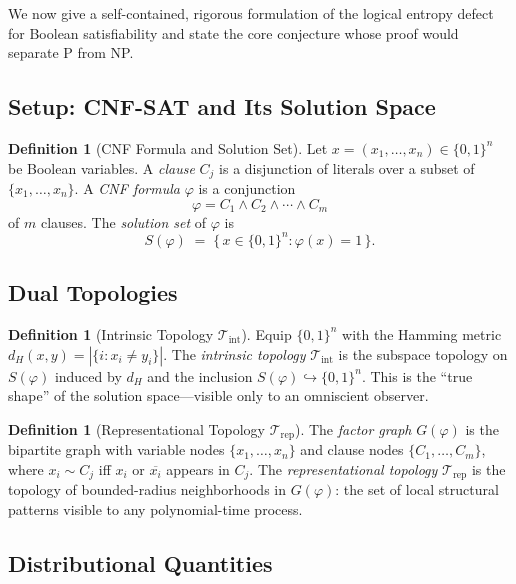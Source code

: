 \documentclass[11pt]{article}
\theoremstyle{definition}
\newtheorem{definition}[theorem]{Definition}
\theoremstyle{remark}
\begin{document}
We now give a self-contained, rigorous formulation of the logical
entropy defect for Boolean satisfiability and state the core
conjecture whose proof would separate P from NP.

\subsection{Setup: CNF-SAT and Its Solution Space}

\begin{definition}[CNF Formula and Solution Set]
\label{def:cnf-solution}
Let $x = (x_1, \ldots, x_n) \in \{0,1\}^n$ be Boolean variables.
A \emph{clause} $C_j$ is a disjunction of literals over a subset of
$\{x_1, \ldots, x_n\}$.  A \emph{CNF formula} $\varphi$ is a
conjunction
\[
  \varphi = C_1 \wedge C_2 \wedge \cdots \wedge C_m
\]
of $m$ clauses.  The \emph{solution set} of $\varphi$ is
\[
  S(\varphi) \;=\; \bigl\{\, x \in \{0,1\}^n : \varphi(x) = 1 \,\bigr\}.
\]
\end{definition}

\subsection{Dual Topologies}

\begin{definition}[Intrinsic Topology $\mathcal{T}_{\mathrm{int}}$]
\label{def:T-int}
Equip $\{0,1\}^n$ with the Hamming metric
$d_H(x,y) = |\{i : x_i \neq y_i\}|$.
The \emph{intrinsic topology} $\mathcal{T}_{\mathrm{int}}$ is the
subspace topology on $S(\varphi)$ induced by $d_H$ and the inclusion
$S(\varphi) \hookrightarrow \{0,1\}^n$.
This is the ``true shape'' of the solution space---visible only to
an omniscient observer.
\end{definition}

\begin{definition}[Representational Topology $\mathcal{T}_{\mathrm{rep}}$]
\label{def:T-rep}
The \emph{factor graph} $G(\varphi)$ is the bipartite graph with
variable nodes $\{x_1, \ldots, x_n\}$ and clause nodes
$\{C_1, \ldots, C_m\}$, where $x_i \sim C_j$ iff $x_i$ or
$\overline{x_i}$ appears in $C_j$.
The \emph{representational topology} $\mathcal{T}_{\mathrm{rep}}$ is the
topology of bounded-radius neighborhoods in $G(\varphi)$: the set of
local structural patterns visible to any polynomial-time process.
\end{definition}

\subsection{Distributional Quantities}
\end{document}
